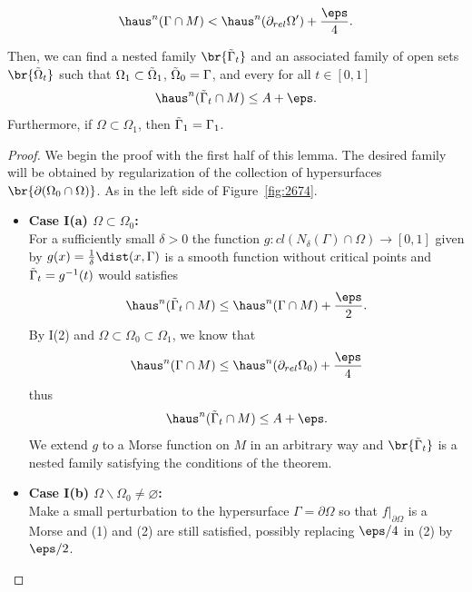 \begin{lemma}
\begin{enumerate}
\begin{enumerate}
\begin{equation*}
                \haus^n(\Gamma\cap M) < \haus^n(\partial_{rel}\Omega') + \frac{\eps}{4}.
            \end{equation*}
        \end{enumerate}
        Then, we can find a nested family $\br{\Tilde{\Gamma}_t}$ and an associated family of open sets $\br{\Tilde{\Omega}_t}$ such that $\Omega_1 \subset \Tilde{\Omega}_1$, $\Tilde{\Omega}_0 = \Gamma$, and every for all $t \in [0, 1]$
        \begin{equation*}
            \haus^n(\Tilde{\Gamma}_t\cap M) \leq A + \eps.
        \end{equation*}
        Furthermore, if $\Omega \subset \Omega_1$, then $\Tilde{\Gamma}_1 = \Gamma_1$. 
    \end{enumerate}
    \begin{proof}
        We begin the proof with the first half of this lemma.
        The desired family will be obtained by regularization of the collection of hypersurfaces $\br{\partial(\Omega_0\cap \Omega)}$. As in the left side of Figure~\ref{fig:2674}.
        \begin{itemize}
            \item \textbf{Case I(a) $\Omega\subset \Omega_0$:}\\
            For a sufficiently small $\delta > 0$ the function $g: cl(N_{\delta}(\Gamma)\cap \Omega)\to [0, 1]$ given by $g(x) = \frac{1}{\delta}\dist(x, \Gamma)$ is a smooth function without critical points and $\Tilde{\Gamma}_t = g^{-1}(t)$ would satisfies
            \begin{equation*}
                \haus^n(\Tilde{\Gamma}_t\cap M) \leq \haus^n(\Gamma\cap M) + \frac{\eps}{2}.
            \end{equation*}
            By I(2) and $\Omega \subset \Omega_0 \subset \Omega_1$, we know that 
            \begin{equation*}
                \haus^n(\Gamma\cap M) \leq \haus^n(\partial_{rel}\Omega_0) + \frac{\eps}{4}
            \end{equation*}
            thus
            \begin{equation*}
                \haus^n(\Tilde{\Gamma}_t\cap M) \leq A + \eps.
            \end{equation*}
            We extend $g$ to a Morse function on $M$ in an arbitrary way and $\br{\Tilde{\Gamma}_t}$ is a nested family satisfying the conditions of the theorem.
            \item \textbf{Case I(b) $\Omega\backslash \Omega_0 \neq \varnothing$:}\\
            Make a small perturbation to the hypersurface $\Gamma = \partial\Omega$ so that $f|_{\partial\Omega}$ is a Morse and (1) and (2) are still satisfied, possibly replacing $\eps/4$ in (2) by $\eps/2$.


\end{itemize}
\end{proof}
\end{lemma}
